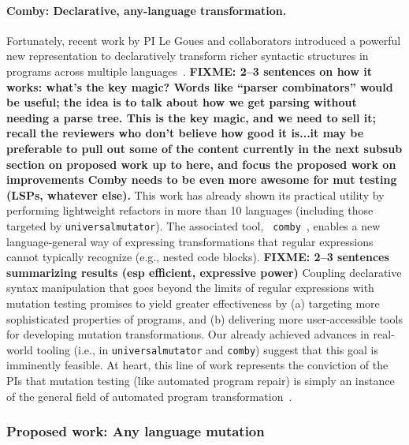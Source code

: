 \paragraph{Comby: Declarative, any-language transformation.} Fortunately, recent work by PI
Le Goues and collaborators introduced a powerful new representation to
declaratively 
transform richer syntactic structures in programs across multiple
languages~\cite{rvt-ppc}. \textbf{FIXME: 2--3 sentences on how it works: what's
  the key magic?  Words like ``parser combinators'' would be useful; the idea is
to talk about how we get parsing without needing a parse tree.  This is the key
magic, and we need to sell it; recall the reviewers who don't believe how good
it is...it may be preferable to pull out some of the content currently in the
next subsub section on proposed work up to here, and focus the proposed work on
improvements Comby needs to be even more awesome for mut testing (LSPs, whatever
else).}  This work has
already shown its practical utility by
performing lightweight refactors in more than 10 languages (including those
targeted by {\tt universalmutator}). The associated tool, {\tt
comby}~\cite{comby-github}, enables a new language-general way of expressing
transformations that regular expressions cannot typically recognize (e.g.,
nested code blocks). \textbf{FIXME: 2--3 sentences summarizing results (esp efficient,
  expressive power)} 
Coupling declarative syntax manipulation that goes beyond the limits
of regular expressions with
mutation testing promises to yield greater effectiveness by (a) targeting more
sophisticated properties of programs, and (b) delivering more user-accessible
tools for developing mutation transformations. Our already achieved advances in 
real-world tooling (i.e., in {\tt universalmutator} and {\tt comby}) suggest that
this goal is imminently feasible.  At heart, this line of work
represents the conviction of the PIs that mutation testing (like
automated program repair) is simply
an instance of the general field of automated program transformation~\cite{Ptransform}.

\subsubsection{Proposed work: Any language mutation}

